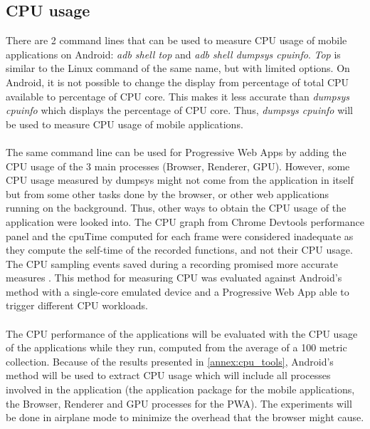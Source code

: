 \documentclass{kththesis}
\begin{document}
\subsection{CPU usage}

There are 2 command lines that can be used to measure CPU usage of mobile applications on Android: \textit{adb shell top} and \textit{adb shell dumpsys cpuinfo}. \textit{Top} is similar to the Linux command of the same name, but with limited options. On Android, it is not possible to change the display from percentage of total CPU available to percentage of CPU core. This makes it less accurate than \textit{dumpsys cpuinfo} which displays the percentage of CPU core. Thus, \textit{dumpsys cpuinfo} will be used to measure CPU usage of mobile applications. 

\paragraph{}
The same command line can be used for Progressive Web Apps by adding the CPU usage of the 3 main processes (Browser, Renderer, GPU). 
However, some CPU usage measured by dumpsys might not come from the application in itself but from some other tasks done by the browser, or other web applications running on the background. 
Thus, other ways to obtain the CPU usage of the application were looked into.
The CPU graph from Chrome Devtools performance panel and the cpuTime computed for each frame were considered inadequate as they compute the self-time of the recorded functions, and not their CPU usage. The CPU sampling events saved during a recording promised more accurate measures \cite{cpu_sampling}. This method for measuring CPU was evaluated against Android's method with a single-core emulated device and a Progressive Web App able to trigger different CPU workloads. \newline

\paragraph{}
The CPU performance of the applications will be evaluated with the CPU usage of the applications while they run, computed from the average of a 100 metric collection. Because of the results presented in \autoref{annex:cpu_tools}, Android's method will be used to extract CPU usage which will include all processes involved in the application (the application package for the mobile applications, the Browser, Renderer and GPU processes for the PWA). The experiments will be done in airplane mode to minimize the overhead that the browser might cause. 
\end{document}
